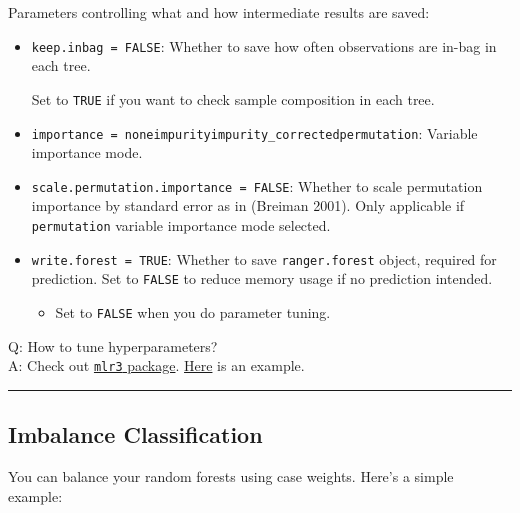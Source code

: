\documentclass[
  a4paper,
  twoside,
  openright]{book}
\providecommand{\tightlist}{%
  \setlength{\itemsep}{0pt}\setlength{\parskip}{0pt}}
\theoremstyle{definition}
\theoremstyle{definition}
\theoremstyle{definition}
\theoremstyle{definition}
\theoremstyle{remark}
\begin{document}
Parameters controlling what and how intermediate results are saved:

\begin{itemize}
\item
  \texttt{keep.inbag\ =\ FALSE}: Whether to save how often observations are in-bag in each tree.

  Set to \texttt{TRUE} if you want to check sample composition in each tree.
\item
  \texttt{importance\ =\ \textquotesingle{}none\textquotesingle{}\textbar{}\textquotesingle{}impurity\textquotesingle{}\textbar{}\textquotesingle{}impurity\_corrected\textquotesingle{}\textbar{}\textquotesingle{}permutation\textquotesingle{}}: Variable importance mode.
\item
  \texttt{scale.permutation.importance\ =\ FALSE}: Whether to scale permutation importance by standard error as in (Breiman 2001). Only applicable if \texttt{\textquotesingle{}permutation\textquotesingle{}} variable importance mode selected.
\item
  \texttt{write.forest\ =\ TRUE}: Whether to save \texttt{ranger.forest} object, required for prediction. Set to \texttt{FALSE} to reduce memory usage if no prediction intended.

  \begin{itemize}
  \tightlist
  \item
    Set to \texttt{FALSE} when you do parameter tuning.
  \end{itemize}
\end{itemize}

Q: How to tune hyperparameters?\\
A: Check out \href{https://mlr3.mlr-org.com}{\texttt{mlr3} package}. \href{https://r.geocompx.org/eco.html}{Here} is an example.

\begin{center}\rule{0.5\linewidth}{0.5pt}\end{center}

\subsection*{Imbalance Classification}\label{imbalance-classification}

You can balance your random forests using case weights. Here's a simple example:
\end{document}

